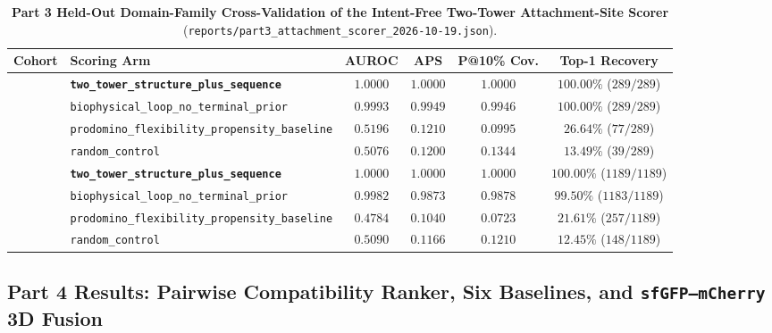 \documentclass[11pt]{article}
\begin{document}
\begin{table}[h]
\centering
\caption{\textbf{Part 3 Held-Out Domain-Family Cross-Validation of the Intent-Free Two-Tower Attachment-Site Scorer} (\texttt{reports/part3\_attachment\_scorer\_2026-10-19.json}).}
\label{tab:part3_results}
\small
\begin{tabular}{l l c c c c}
\toprule
\textbf{Cohort} & \textbf{Scoring Arm} & \textbf{AUROC} & \textbf{APS} & \textbf{P@10\% Cov.} & \textbf{Top-1 Recovery} \\
\midrule
{}
  & \textbf{\texttt{two\_tower\_structure\_plus\_sequence}} & $\mathbf{1.0000}$ & $\mathbf{1.0000}$ & $\mathbf{1.0000}$ & $\mathbf{100.00\%}$ ($289/289$) \\
  & \texttt{biophysical\_loop\_no\_terminal\_prior} & $0.9993$ & $0.9949$ & $0.9946$ & $100.00\%$ ($289/289$) \\
  & \texttt{prodomino\_flexibility\_propensity\_baseline} & $0.5196$ & $0.1210$ & $0.0995$ & $26.64\%$ ($77/289$) \\
  & \texttt{random\_control} & $0.5076$ & $0.1200$ & $0.1344$ & $13.49\%$ ($39/289$) \\
\midrule
{}
  & \textbf{\texttt{two\_tower\_structure\_plus\_sequence}} & $\mathbf{1.0000}$ & $\mathbf{1.0000}$ & $\mathbf{1.0000}$ & $\mathbf{100.00\%}$ ($1189/1189$) \\
  & \texttt{biophysical\_loop\_no\_terminal\_prior} & $0.9982$ & $0.9873$ & $0.9878$ & $99.50\%$ ($1183/1189$) \\
  & \texttt{prodomino\_flexibility\_propensity\_baseline} & $0.4784$ & $0.1040$ & $0.0723$ & $21.61\%$ ($257/1189$) \\
  & \texttt{random\_control} & $0.5090$ & $0.1166$ & $0.1210$ & $12.45\%$ ($148/1189$) \\
\bottomrule
\end{tabular}
\end{table}

\subsection{Part 4 Results: Pairwise Compatibility Ranker, Six Baselines, and \texttt{sfGFP---mCherry} 3D Fusion}
\label{sec:part4}
\end{document}
